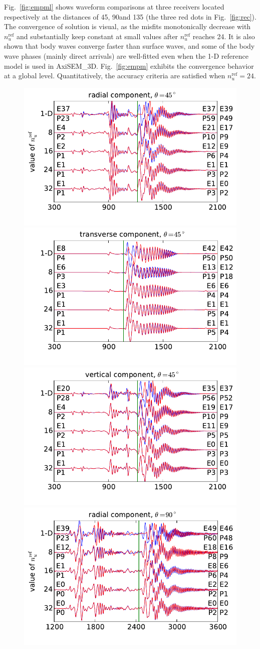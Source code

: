 \documentclass[extra]{gji}
\begin{document}
Fig.~\ref{fig:empml} shows waveform comparisons at three receivers located
respectively at the distances of 45\degr, 90\degr and 135\degr 
(the three red dots in Fig.~\ref{fig:rec}). The convergence of solution 
is visual, as the misfits monotonically decrease with $n_u^\text{ref}$ 
and substantially keep constant at small values after $n_u^\text{ref}$
reaches 24. It is also shown that body waves converge faster than 
surface waves, and some of the body wave phases (mainly direct arrivals) 
are well-fitted even when the 1-D reference model is used in AxiSEM\_3D. 
Fig.~\ref{fig:empm} exhibits the convergence behavior at a global level.
Quantitatively, the accuracy criteria are satisfied when $n_u^\text{ref}=24$.

\begin{figure}
  \centering 
  \includegraphics[width=.35\textwidth]{fig/conv_seism/VIR_s3_17_45xxx_R.pdf}\hspace{-15pt}
  \includegraphics[width=.35\textwidth]{fig/conv_seism/VIR_s3_17_45xxx_T.pdf}\hspace{-15pt}
  \includegraphics[width=.35\textwidth]{fig/conv_seism/VIR_s3_17_45xxx_Z.pdf}\vspace{-10pt}
  \includegraphics[width=.35\textwidth]{fig/conv_seism/VIR_s3_17_90xxx_R.pdf}\hspace{-15pt}

\end{figure}
\end{document}
